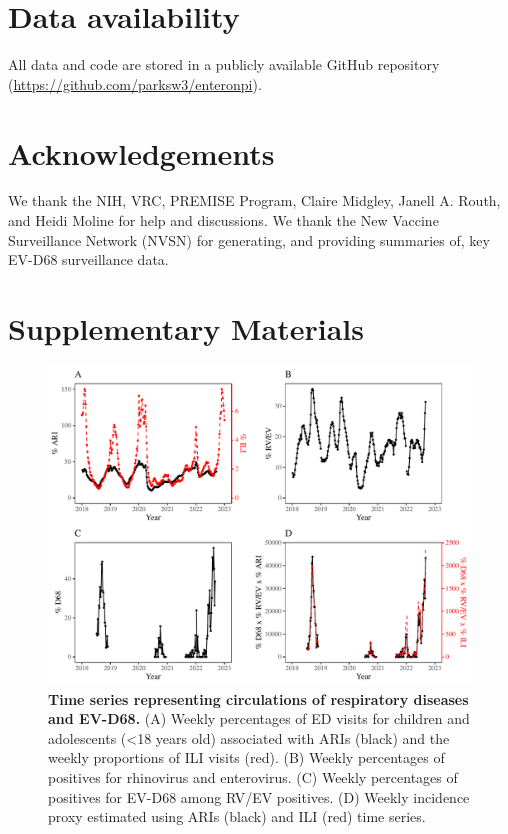 \documentclass[12pt]{article}
\begin{document}
\section*{Data availability}

All data and code are stored in a publicly available GitHub repository (\url{https://github.com/parksw3/enteronpi}).


\section*{Acknowledgements}

We thank the NIH, VRC, PREMISE Program, Claire Midgley, Janell A. Routh, and Heidi Moline for help and discussions.
We thank the New Vaccine Surveillance Network (NVSN) for generating, and providing summaries of, key EV-D68 surveillance data.

\pagebreak

\section*{Supplementary Materials}
\setcounter{figure}{0}
\renewcommand{\thefigure}{S\arabic{figure}}

\begin{figure}[!th]
\includegraphics[width=\textwidth]{../figure_pub/figure_data_processed_d68.pdf}
\caption{
\textbf{Time series representing circulations of respiratory diseases and EV-D68.}
(A) Weekly percentages of ED visits for children and adolescents (<18 years old) associated with ARIs (black) and the weekly proportions of ILI visits (red).
(B) Weekly percentages of positives for rhinovirus and enterovirus.
(C) Weekly percentages of positives for EV-D68 among RV/EV positives.
(D) Weekly incidence proxy estimated using ARIs (black) and ILI (red) time series.
}
\end{figure}
\end{document}
